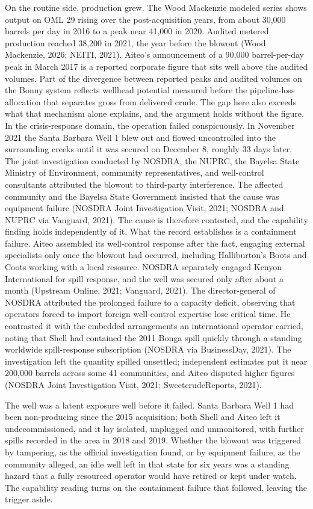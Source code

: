 On the routine side, production grew. The Wood Mackenzie modeled series
shows output on OML 29 rising over the post-acquisition years, from
about 30,000 barrels per day in 2016 to a peak near 41,000 in 2020.
Audited metered production reached 38,200 in 2021, the year before the
blowout (Wood Mackenzie, 2026; NEITI, 2021). Aiteo's announcement of a
90,000 barrel-per-day peak in March 2017 is a reported corporate figure
that sits well above the audited volumes. Part of the divergence between
reported peaks and audited volumes on the Bonny system reflects wellhead
potential measured before the pipeline-loss allocation that separates
gross from delivered crude. The gap here also exceeds what that
mechanism alone explains, and the argument holds without the figure. In
the crisis-response domain, the operation failed conspicuously. In
November 2021 the Santa Barbara Well 1 blew out and flowed uncontrolled
into the surrounding creeks until it was secured on December 8, roughly
33 days later. The joint investigation conducted by NOSDRA, the NUPRC,
the Bayelsa State Ministry of Environment, community representatives,
and well-control consultants attributed the blowout to third-party
interference. The affected community and the Bayelsa State Government
insisted that the cause was equipment failure (NOSDRA Joint
Investigation Visit, 2021; NOSDRA and NUPRC via Vanguard, 2021). The
cause is therefore contested, and the capability finding holds
independently of it. What the record establishes is a containment
failure. Aiteo assembled its well-control response after the fact,
engaging external specialists only once the blowout had occurred,
including Halliburton's Boots and Coots working with a local resource.
NOSDRA separately engaged Kenyon International for spill response, and
the well was secured only after about a month (Upstream Online, 2021;
Vanguard, 2021). The director-general of NOSDRA attributed the prolonged
failure to a capacity deficit, observing that operators forced to import
foreign well-control expertise lose critical time. He contrasted it with
the embedded arrangements an international operator carried, noting that
Shell had contained the 2011 Bonga spill quickly through a standing
worldwide spill-response subscription (NOSDRA via BusinessDay, 2021).
The investigation left the quantity spilled unsettled; independent
estimates put it near 200,000 barrels across some 41 communities, and
Aiteo disputed higher figures (NOSDRA Joint Investigation Visit, 2021;
SweetcrudeReports, 2021).

The well was a latent exposure well before it failed. Santa Barbara Well
1 had been non-producing since the 2015 acquisition; both Shell and
Aiteo left it undecommissioned, and it lay isolated, unplugged and
unmonitored, with further spills recorded in the area in 2018 and 2019.
Whether the blowout was triggered by tampering, as the official
investigation found, or by equipment failure, as the community alleged,
an idle well left in that state for six years was a standing hazard that
a fully resourced operator would have retired or kept under watch. The
capability reading turns on the containment failure that followed,
leaving the trigger aside.

